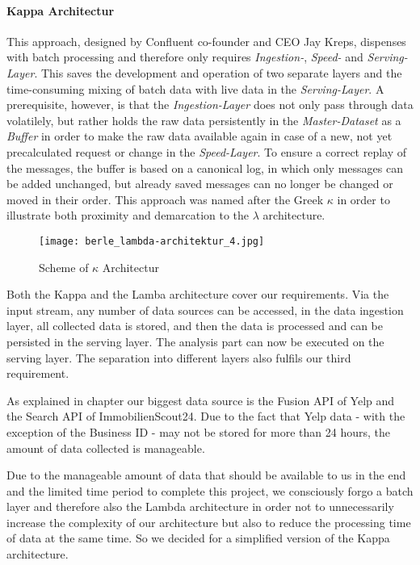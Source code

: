 \paragraph{Kappa Architectur}
This approach, designed by Confluent co-founder and CEO Jay Kreps, dispenses with batch processing and therefore only requires
\textit{Ingestion-}, \textit{Speed-} and \textit{Serving-Layer}.
This saves the development and operation of two separate layers and the time-consuming mixing of batch data with live data in the \textit{Serving-Layer}.
A prerequisite, however, is that the \textit{Ingestion-Layer} does not only pass through data volatilely,
but rather holds the raw data persistently in the \textit{Master-Dataset} as a \textit{Buffer} in order to make the raw data available again in case of a new,
not yet precalculated request or change in the \textit{Speed-Layer}.
To ensure a correct replay of the messages, the buffer is based on a canonical log, in which only messages can be added unchanged, but already saved messages can no
longer be changed or moved in their order.
This approach was named after the Greek $\kappa$ in order to illustrate both proximity and demarcation to the $\lambda$ architecture.
\cite{Kappa} \cite{Kappa2}

\begin{figure}[h]
	\centering
	\texttt{[image: berle\_lambda-architektur\_4.jpg]}
	\caption[Scheme of $\kappa$ Architectur]{Scheme of $\kappa$ Architectur\cite{jaxkappa}}
	\label{fig:KappaArchitecture}
\end{figure}

Both the Kappa and the Lamba architecture cover our requirements.
Via the input stream, any number of data sources can be accessed, in the
data ingestion layer, all collected data is stored, and then the data is processed and can be persisted in the serving layer.
The analysis part can now be executed on the serving layer.
The separation into different layers also fulfils our third requirement.

As explained in chapter  our biggest data source is the Fusion \ac{API} of Yelp and
the Search \ac{API} of ImmobilienScout24.
Due to the fact that Yelp data - with the exception of the Business ID - may not be stored for more than 24 hours,\cite{YelpFaq}
the amount of data collected is manageable.

Due to the manageable amount of data that should be available to us in the end and the limited time period to complete this project,
we consciously forgo a batch layer and therefore also the Lambda architecture
in order not to unnecessarily increase the complexity of our architecture but also to reduce the processing time of data at the same time.
So we decided for a simplified version of the Kappa architecture.

